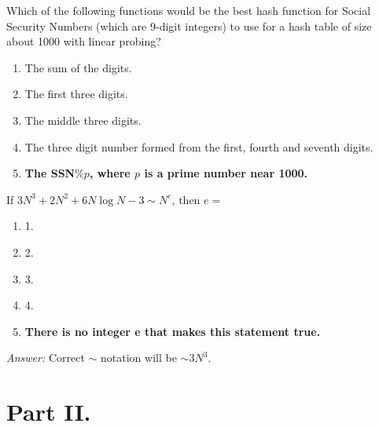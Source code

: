 \documentclass[a4paper]{article}
\newcommand{\ans}{\textit{Answer: }}
\newenvironment{question}[2][Question]{\begin{trivlist}
\item[\hskip \labelsep {\bfseries #1}\hskip \labelsep {\bfseries #2.}]}{\end{trivlist}}
\begin{document}
\begin{question}{10}
Which of the following functions would be the best hash function for Social
Security Numbers (which are 9-digit integers) to use for a hash table of size about 1000 with linear probing?

\begin{enumerate}[label=\alph*]
  \item The sum of the digits.
  \item The first three digits.
  \item The middle three digits.
  \item The three digit number formed from the first, fourth and seventh digits.
  \item \textbf{The SSN$\%p$, where $p$ is a prime number near 1000.}
\end{enumerate}

\end{question}

\begin{question}{11}
If $3N^3 + 2N^2 + 6N \log N − 3 ∼ N^e$, then $e =$

\begin{enumerate}[label=\alph*]
  \item 1.
  \item 2.
  \item 3.
  \item 4.
  \item \textbf{There is no integer e that makes this statement true.}
\end{enumerate}
\ans Correct $\sim$ notation will be $\sim 3N^3$.

\end{question}


\section*{Part II.}
\end{document}
